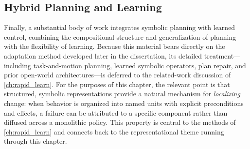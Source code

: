 \subsection{Hybrid Planning and Learning}
\label{sec:hybrid_planning_learning_rw}

Finally, a substantial body of work integrates symbolic planning with learned control, combining the compositional structure and generalization of planning with the flexibility of learning. Because this material bears directly on the adaptation method developed later in the dissertation, its detailed treatment---including task-and-motion planning, learned symbolic operators, plan repair, and prior open-world architectures---is deferred to the related-work discussion of \cref{ch:rapid_learn}. For the purposes of this chapter, the relevant point is that structured, symbolic representations provide a natural mechanism for \emph{localizing} change: when behavior is organized into named units with explicit preconditions and effects, a failure can be attributed to a specific component rather than diffused across a monolithic policy. This property is central to the methods of \cref{ch:rapid_learn} and connects back to the representational theme running through this chapter.
